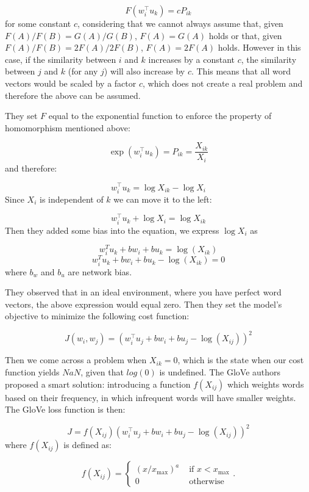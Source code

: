 \[
F(w_i^\top u_k) = c P_{ik}
\]
\noindent
for some constant $c$, considering that we cannot always assume that, given \\$F(A)/F(B) = G(A)/G(B)$, $F(A) = G(A)$ holds or that, given \\$F(A)/F(B) = 2F(A)/2F(B)$, $F(A) = 2F(A)$ holds. However in this case, if the similarity between $i$ and $k$ increases by a constant $c$, the similarity between $j$ and $k$ (for any $j$) will also increase by $c$. This means that all word vectors would be scaled by a factor $c$, which does not create a real problem and therefore the above can be assumed.

They set $F$ equal to the exponential function to enforce the property of homomorphism mentioned above: 

\[
\exp(w_i^\top u_k) = P_{ik} = \frac{X_{ik}}{X_i}
\]
\noindent
and therefore:

\[
w_i^\top u_k = \log X_{ik} - \log X_{i}
\]
\noindent
Since $X_i$ is independent of $k$ we can move it to the left:

\[
w_i^\top u_k + \log X_{i}= \log X_{ik}
\]
\noindent
Then they added some bias into the equation, we express $\log X_{i}$ as

\[
w_i^T u_k + bw_i + bu_k = \log(X_{ik}) 
\]
\[
w_i^T u_k + bw_i + bu_k - \log(X_{ik}) = 0
\]
\noindent
where $b_w$ and $b_u$ are network bias.

They observed that in an ideal environment, where you have perfect word vectors, the above expression would equal zero. Then they set the model's objective to minimize the following cost function:

\[
J(w_i, w_j) = (w_i^\top u_j + bw_i + bu_j - \log(X_{ij}))^2
\]

Then we come across a problem when $X_{ik} = 0$, which is the state when our cost function yields $\mathit{NaN}$, given that $log(0)$ is undefined. The GloVe authors proposed a smart solution: introducing a function $f(X_{ij})$ which weights words based on their frequency, in which infrequent words will have smaller weights. The \ac{GloVe} loss function is then:

\[
J = f(X_{ij})(w_i^\top u_j + bw_i + bu_j - \log(X_{ij}))^2
\]
\noindent
where $f(X_{ij})$ is defined as:

\[
f(X_{ij}) = 
\begin{cases}
(x/x_{\max})^a & \text{ if } x < x_{\max}\\ 
0 & \text{ otherwise}
\end{cases}.
\]

